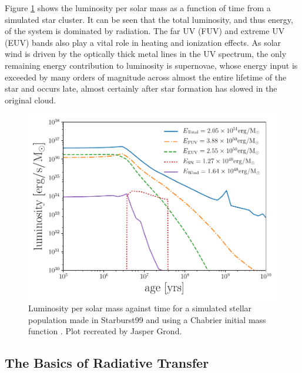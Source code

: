 Figure \ref{fig:lumvsage} shows the luminosity per solar mass as a function of time from a simulated star cluster. It can be seen that the total luminosity, and thus energy, of the system is dominated by radiation. The far UV (FUV) and extreme UV (EUV) bands also play a vital role in heating and ionization effects. As solar wind is driven by the optically thick metal lines in the UV spectrum, the only remaining energy contribution to luminosity is supernovae, whose energy input is exceeded by many orders of magnitude across almost the entire lifetime of the star and occurs late, almost certainly after star formation has slowed in the original cloud.

\begin{figure}[H]
    \centering
    \includegraphics[width=\textwidth]{"./plots/CH1/uvsn"}
    \caption{Luminosity per solar mass against time for a simulated stellar population made in Starburst99 and using a Chabrier initial mass function \citep{starburst}. Plot recreated by Jasper Grond. \citep{grond}}
    \label{fig:lumvsage}
\end{figure}

\subsection{The Basics of Radiative Transfer}

